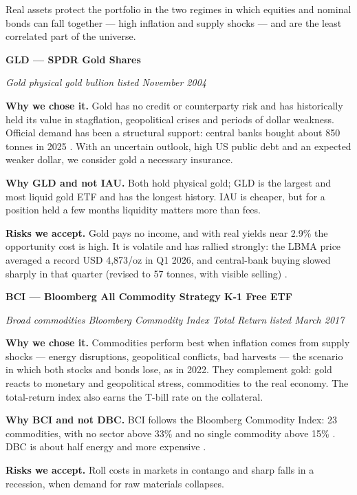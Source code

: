 Real assets protect the portfolio in the two regimes in which equities
and nominal bonds can fall together --- high inflation and supply shocks
--- and are the least correlated part of the universe.

\textbf{GLD --- SPDR Gold Shares}

\emph{Gold \textperiodcentered{} physical gold bullion \textperiodcentered{} listed November 2004}

\textbf{Why we chose it.} Gold has no credit or counterparty risk and
has historically held its value in stagflation, geopolitical crises and
periods of dollar weakness. Official demand has been a structural
support: central banks bought about 850 tonnes in 2025 \cite{wgc}. With an
uncertain outlook, high US public debt and an expected weaker dollar, we
consider gold a necessary insurance.

\textbf{Why GLD and not IAU.} Both hold physical gold; GLD is the
largest and most liquid gold ETF and has the longest history. IAU is
cheaper, but for a position held a few months liquidity matters more
than fees.

\textbf{Risks we accept.} Gold pays no income, and with real yields near
2.9\% the opportunity cost is high. It is volatile and has rallied
strongly: the LBMA price averaged a record USD 4,873/oz in Q1 2026, and
central-bank buying slowed sharply in that quarter (revised to 57
tonnes, with visible selling) \cite{wgc}.

\textbf{BCI --- Bloomberg All Commodity Strategy K-1 Free ETF}

\emph{Broad commodities \textperiodcentered{} Bloomberg Commodity Index Total Return \textperiodcentered{}
listed March 2017}

\textbf{Why we chose it.} Commodities perform best when inflation comes
from supply shocks --- energy disruptions, geopolitical conflicts, bad
harvests --- the scenario in which both stocks and bonds lose, as in
2022. They complement gold: gold reacts to monetary and geopolitical
stress, commodities to the real economy. The total-return index also
earns the T-bill rate on the collateral.

\textbf{Why BCI and not DBC.} BCI follows the Bloomberg Commodity Index:
23 commodities, with no sector above 33\% and no single commodity above
15\% \cite{bcom}. DBC is about half energy and more expensive \cite{teamresearch}.

\textbf{Risks we accept.} Roll costs in markets in contango and sharp
falls in a recession, when demand for raw materials collapses.

